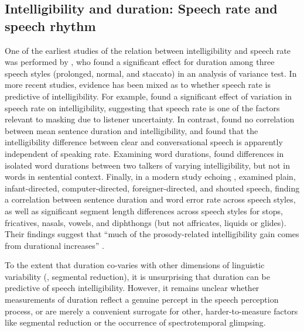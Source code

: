 \subsection[Intelligibility and duration]{Intelligibility and duration: Speech rate and speech rhythm\label{sec:IntelDur}}
One of the earliest studies of the relation between intelligibility and speech rate was performed by \citet{Tolhurst1957a}, who found a significant effect for duration among three speech styles (prolonged, normal, and staccato) in an analysis of variance test.  In more recent studies, evidence has been mixed as to whether speech rate is predictive of intelligibility.  For example, \citet{SommersEtAl1994} found a significant effect of variation in speech rate on intelligibility, suggesting that speech rate is one of the factors relevant to masking due to listener uncertainty.  In contrast, \citet{BradlowEtAl1996} found no correlation between mean sentence duration and intelligibility, and \citet{KrauseBraida2002} found that the intelligibility difference between clear and conversational speech is apparently independent of speaking rate.  Examining word durations, \citet{BondMoore1994} found differences in isolated word durations between two talkers of varying intelligibility, but not in words in sentential context.  Finally, in a modern study echoing \citet{Tolhurst1957a}, \citet{MayoEtAl2012} examined plain, infant-directed, computer-directed, foreigner-directed, and shouted speech, finding a correlation between sentence duration and word error rate across speech styles, as well as significant segment length differences across speech styles for stops, fricatives, nasals, vowels, and diphthongs (but not affricates, liquids or glides).  Their findings suggest that “much of the prosody-related intelligibility gain comes from durational increases” \citep{MayoEtAl2012}.

To the extent that duration co-varies with other dimensions of linguistic variability (\eg, segmental reduction), it is unsurprising that duration can be predictive of speech intelligibility.  However, it remains unclear whether measurements of duration reflect a genuine percept in the speech perception process, or are merely a convenient surrogate for other, harder-to-measure factors like segmental reduction or the occurrence of spectrotemporal glimpsing.

